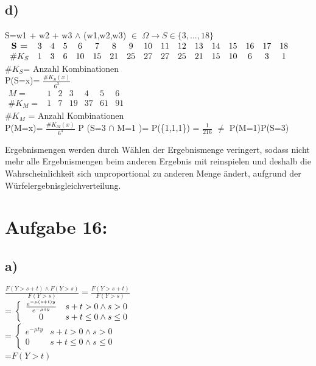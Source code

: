 \documentclass[11pt]{article} %
\begin{document}
{\subsection*{d)}
S=w1 + w2 + w3 $\land$ (w1,w2,w3) $\in$ $\Omega \rightarrow S \in \{3, ... , 18\} $
$\\ \\
\begin{array}{ccccccccccccccccc} 
	\textbf{S =} & 3  & 4 & 5 & 6 & 7 & 8 & 9 & 10 & 11 & 12 & 13 & 14 & 15 & 16 & 17 & 18 \\
	
	\#K_S & 1   & 3 & 6 & 10  & 15  & 21 & 25 & 27 & 27  & 25  & 21 & 15  & 10 &6  & 3 &1  \\

\end{array}$\\

\#$K_S$= Anzahl Kombinationen \\
P(S=x)= $\frac{\#K_S(x)}{6^3}$\\

$\begin{matrix}
M =  & 1 & 2 & 3 & 4 & 5 & 6 \\
\#K_M =  & 1 & 7 & 19 & 37 & 61 & 91
\end{matrix}$ \\
\#$K_M$ = Anzahl Kombinationen \\
P(M=x)= $\frac{\#K_M(x)}{6^3}$
P (S=3 $\cap$ M=1 )= P(\{1,1,1\}) = $\frac{1}{216}$ $\neq$ P(M=1)P(S=3)

Ergebnismengen werden durch Wählen der Ergebnismenge veringert, sodass nicht mehr alle Ergebnismengen beim anderen Ergebnis mit reinspielen und deshalb die Wahrscheinlichkeit sich unproportional zu anderen Menge ändert, aufgrund der Würfelergebnisgleichverteilung.

\section*{\textbf Aufgabe 16:}

\subsection*{a)}
$\frac{ F(Y >s+t) \land F(Y>s)}{F(Y>s)} = \frac{F(Y>s+t)}{F(Y>s)}$\\
= $\left\{\\
\begin{array}{cc}
  \frac{e^{-\mu (s+t)y}}{e^{-\mu s y}}   & s+t > 0 \land s  > 0 \\
  0 & s+t \leq 0 \land s \leq 0 
\end{array}\right. $\\
= $\left\{
 \begin{array}{cc}
  e^{-\mu t y}   & s+t > 0 \land s  >0 \\
  0 & s+t \leq 0 \land s \leq 0
\end{array} \right. $
\\=$F(Y>t)$
}
\end{document}

